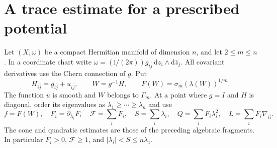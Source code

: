 \section{A trace estimate for a prescribed potential}

Let $(X,\omega)$ be a compact Hermitian manifold of dimension $n$, and let $2\leq m\leq n$. In a coordinate chart write $\omega=(\mathrm i/(2\pi))g_{i\bar j}\,\mathrm dz_i\wedge\mathrm d\bar z_j$. All covariant derivatives use the Chern connection of $g$. Put
\[
 H_{i\bar j}=g_{i\bar j}+u_{i\bar j},\qquad W=g^{-1}H,
 \qquad F(W)=\sigma_m(\lambda(W))^{1/m}.
\]
The function $u$ is smooth and $W$ belongs to $\Gamma_m$. At a point where $g=I$ and $H$ is diagonal, order its eigenvalues as $\lambda_1\geq\cdots\geq\lambda_n$ and use
\[
 f=F(W),\quad F_i=\partial_{\lambda_i}F,\quad
 \mathcal F=\sum_iF_i,\quad S=\sum_i\lambda_i,\quad
 Q=\sum_iF_i\lambda_i^2,\quad L=\sum_iF_i\nabla_{i\bar i}.
\]
The cone and quadratic estimates are those of the preceding algebraic fragments. In particular $F_i>0$, $\mathcal F\geq1$, and $|\lambda_i|<S\leq n\lambda_1$.

